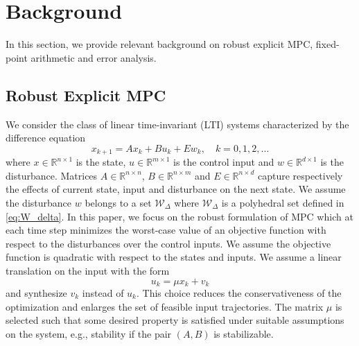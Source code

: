 \section{Background}
In this section, we provide relevant background on robust explicit MPC,
fixed-point arithmetic and error analysis.

\subsection{Robust Explicit MPC}
\def\reals{\mathbb{R}}
We consider the class of linear time-invariant (LTI) systems characterized by the difference equation
\begin{equation}
\label{eq:DSS}
x_{k+1}=Ax_k+Bu_k+Ew_k,\quad  k=0,1,2,\ldots
\end{equation}
where $x\in \reals^{n\times 1}$ is the state, $u\in \reals^{m\times 1}$ is the control input and $w\in \reals^{d\times 1}$ is the disturbance. Matrices $A\in \reals^{n\times n}$, $B\in \reals^{n\times m}$ and $E\in \reals^{n\times d}$  capture respectively the effects of current state, input and disturbance on the next state. We assume the disturbance $w$ belongs to a set $\mathcal{W}_{\Delta}$ where $\mathcal{W}_{\Delta}$ is a polyhedral set defined in \autoref{eq:W_delta}.
In this paper, we focus on the robust formulation of MPC which at each time step
minimizes the worst-case value of an objective function with respect to the
disturbances over the control inputs. We assume the objective function is
quadratic with respect to the states and inputs.
We assume a linear translation on the input with the form
$$u_k=\mu x_k+v_k$$
and synthesize $v_k$ instead of $u_k$. This choice reduces the 
conservativeness of the optimization and enlarges the set of feasible input
trajectories. The matrix $\mu$ is selected such that some desired property is satisfied under suitable assumptions on the system, e.g., stability if the pair $(A,B)$ is stabilizable.

